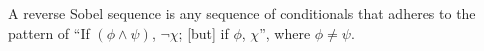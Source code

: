 A reverse Sobel sequence is any sequence of conditionals that adheres to the pattern of \enquote{If $(\phi\land\psi)$, $\neg\chi$; [but] if $\phi$, $\chi$}, where $\phi\neq\psi$.%
